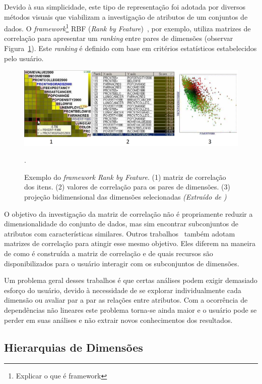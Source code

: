 Devido à sua simplicidade, este tipo de representação foi adotada por diversos métodos visuais que viabilizam a investigação de atributos de um conjuntos de dados. O \emph{framework}\footnote{Explicar o que é framework} RBF (\emph{Rank by Feature})~\cite{RBF2004}, por exemplo, utiliza matrizes de correlação para apresentar um \emph{ranking} entre pares de dimensões (observar Figura~\ref{fig:rbf1}). Este \emph{ranking} é definido com base em critérios estatísticos estabelecidos pelo usuário. 

\begin{figure}[h!]
    \centering
    \includegraphics[width=\textwidth]{images/rbf1.png}
    \caption[Rank by Feature Framework]{Exemplo do \emph{framework Rank by Feature}. (1) matriz de correlação dos itens. (2) valores de correlação para os pares de dimensões. (3) projeção bidimensional das dimensões selecionadas \emph{(Extraído de \cite{RBF2004})}}.
    \label{fig:rbf1}
\end{figure}

O objetivo da investigação da matriz de correlação não é propriamente reduzir a dimensionalidade do conjunto de dados, mas sim encontrar subconjuntos de atributos com características similares. Outros trabalhos~\cite{Guo2003,MacEachren2003,May2011,May2011ss} também adotam matrizes de correlação para atingir esse mesmo objetivo. Eles diferem na maneira de como é construída a matriz de correlação e de quais recursos são disponibilizados para o usuário interagir com os subconjuntos de dimensões.

Um problema geral desses trabalhos é que certas análises podem exigir demasiado esforço do usuário, devido à necessidade de se explorar individualmente cada dimensão ou avaliar par a par as relações entre atributos. Com a ocorrência de dependências não lineares este problema torna-se ainda maior e o usuário pode se perder em suas análises e não extrair novos conhecimentos dos resultados. 
\subsection{Hierarquias de Dimensões}

